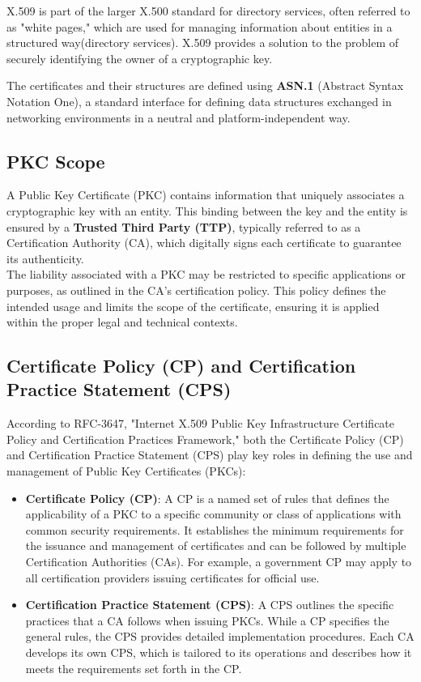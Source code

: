 X.509 is part of the larger X.500 standard for directory services,
often referred to as "white pages," which are used for managing
information about entities in a structured way(directory services).
X.509 provides a solution to the problem of securely identifying the
owner of a cryptographic key.

The certificates and their structures are defined using \textbf{ASN.1}
(Abstract Syntax Notation One), a standard interface for defining data
structures exchanged in networking environments in a neutral and 
platform-independent way. 

\subsection{PKC Scope}
A Public Key Certificate (PKC) contains information that uniquely
associates a cryptographic key with an entity. This binding between
the key and the entity is ensured by a \textbf{Trusted Third Party
(TTP)}, typically referred to as a Certification Authority (CA), which
digitally signs each certificate to guarantee its authenticity.\\

The liability associated with a PKC may be restricted to specific
applications or purposes, as outlined in the CA's certification
policy. This policy defines the intended usage and limits the scope of
the certificate, ensuring it is applied within the proper legal and
technical contexts.

\subsection{Certificate Policy (CP) and Certification Practice
Statement (CPS)}

According to RFC-3647, "Internet X.509 Public Key Infrastructure
Certificate Policy and Certification Practices Framework," both the
Certificate Policy (CP) and Certification Practice Statement (CPS)
play key roles in defining the use and management of Public Key
Certificates (PKCs):

\begin{itemize}
  \item \textbf{Certificate Policy (CP)}: A CP is a named set of rules
    that defines the applicability of a PKC to a specific community
    or class of applications with common security requirements. It
    establishes the minimum requirements for the issuance and
    management of certificates and can be followed by multiple
    Certification Authorities (CAs). For example, a government CP
    may apply to all certification providers issuing certificates
    for official use.

  \item \textbf{Certification Practice Statement (CPS)}: A CPS outlines
    the specific practices that a CA follows when issuing PKCs.
    While a CP specifies the general rules, the CPS provides
    detailed implementation procedures. Each CA develops its own
    CPS, which is tailored to its operations and describes how it
    meets the requirements set forth in the CP.
\end{itemize}

